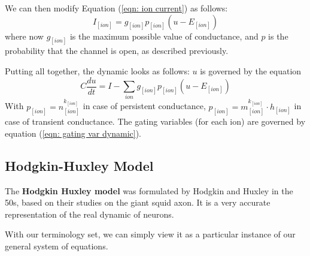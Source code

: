 \documentclass[oneside]{book}
\theoremstyle{definition}
\theoremstyle{plain}
\begin{document}
We can then modify Equation (\ref{eqn: ion current}) as follows:
\begin{equation}
     I_{[ion]} = g_{[ion]} p_{[ion]} (u-E_{[ion]})
\end{equation}
where now $g_{[ion]}$ is the maximum possible value of conductance, and $p$ is the probability that the channel is open, as described previously.

Putting all together, the dynamic looks as follows:
$u$ is governed by the equation
\begin{equation}
    \label{eqn:potential dynamic}
    C \frac{du}{dt} = I - \sum_{ion} g_{[ion]} p_{[ion]} (u-E_{[ion]})
\end{equation}
With $p_{[ion]}=n_{ [ion]}^{k_{[ion]}}$ in case of  persistent conductance, $p_{[ion]}=m_{[ion]}^{k_{[ion]}} \cdot h_{[ion]}$ in case of transient conductance.
The gating variables (for each ion) are governed by equation (\ref{eqn: gating var dynamic}).
\subsection{Hodgkin-Huxley Model}
The \textbf{Hodgkin Huxley model} was formulated by Hodgkin and Huxley in the 50s, based on their studies on the giant squid axon.
It is a very accurate representation of the real dynamic of neurons.

With our terminology set, we can simply view it as a particular instance of our general system of equations.
\end{document}

